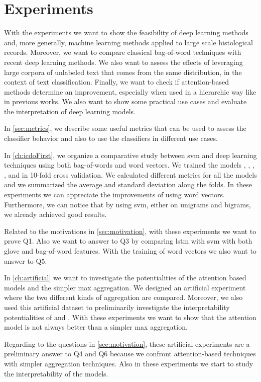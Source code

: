 \chapter{Experiments}
With the experiments we want to show the feasibility of deep learning
methods and, more generally, machine learning methods applied to large
scale histological records. Moreover, we want to compare classical
bag-of-word techniques with recent deep learning methods. We also want
to assess the effects of leveraging large corpora of unlabeled text
that comes from the same distribution, in the context of text
classification. Finally, we want to check if attention-based methods
determine an improvement, especially when used in a hierarchic way
like in
previous works. We also want to show some practical use cases and
evaluate the interpretation of deep learning models.

In \cref{sec:metrics}, we describe some useful metrics that can
be used to assess the 
classifier behavior and also to use the classifiers in different use
cases.

In \cref{ch:icdoFirst}, we organize a comparative study between
\ac{svm} and deep learning techniques using both bag-of-words and word
vectors. We trained the models \svm, \svmb, \lstmng, \lstmc, and
\lstmb in 10-fold cross validation. We calculated 
different metrics for all the models and we summarized the average and
standard deviation 
along the folds. In these
experiments we can appreciate the improvements of using word
vectors. Furthermore, we can notice that by using \ac{svm}, either on
unigrams and bigrams, we already achieved good results.

Related to the motivations in \cref{sec:motivation}, with these
experiments we want to prove Q1. Also we want to answer to Q3 by
comparing \ac{lstm} with
\ac{svm} with both \ac{glove} and bag-of-word features.  
With the training of word vectors we also want to answer to Q5.

In \ref{ch:artificial} we want to investigate the potentialities of
the attention based models and the simpler max aggregation. We
designed an artificial experiment where the two different
kinds of aggregation are compared. Moreover, we also used this artificial
dataset to preliminarily investigate the interpretability
potentialities of \maxi{} and \softmaxi{}. With these experiments we
want to show that the attention model is not always better than a
simpler max aggregation.

Regarding to the questions in \cref{sec:motivation}, these
artificial experiments are a preliminary answer to Q4 and Q6 because
we confront attention-based techniques with simpler aggregation
techniques. Also in these experiments we start to study the
interpretability of the models. 

